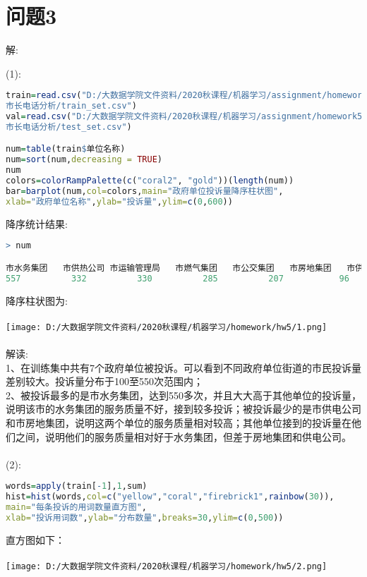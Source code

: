 \documentclass[]{article}
\begin{document}
\section{问题3}
\begin{flushleft}
	解:
\end{flushleft}
(1):
\begin{lstlisting}[language=R]
train=read.csv("D:/大数据学院文件资料/2020秋课程/机器学习/assignment/homework5/
市长电话分析/train_set.csv")
val=read.csv("D:/大数据学院文件资料/2020秋课程/机器学习/assignment/homework5/
市长电话分析/test_set.csv")

num=table(train$单位名称)
num=sort(num,decreasing = TRUE)
num
colors=colorRampPalette(c("coral2", "gold"))(length(num))
bar=barplot(num,col=colors,main="政府单位投诉量降序柱状图",
xlab="政府单位名称",ylab="投诉量",ylim=c(0,600))
\end{lstlisting}
降序统计结果:
\begin{lstlisting}[language=R]
> num

市水务集团   市供热公司 市运输管理局   市燃气集团   市公交集团   市房地集团   市供电公司 
557          332          330          285          207           96           93 
\end{lstlisting}
降序柱状图为:\\\\
\texttt{[image: D:/大数据学院文件资料/2020秋课程/机器学习/homework/hw5/1.png]}\\\\
解读:\\
1、在训练集中共有7个政府单位被投诉。可以看到不同政府单位街道的市民投诉量差别较大。投诉量分布于100至550次范围内；\\
2、被投诉最多的是市水务集团，达到550多次，并且大大高于其他单位的投诉量，说明该市的水务集团的服务质量不好，接到较多投诉；被投诉最少的是市供电公司和市房地集团，说明这两个单位的服务质量相对较高；其他单位接到的投诉量在他们之间，说明他们的服务质量相对好于水务集团，但差于房地集团和供电公司。\\\\
(2):
\begin{lstlisting}[language=R]
words=apply(train[-1],1,sum)
hist=hist(words,col=c("yellow","coral","firebrick1",rainbow(30)),
main="每条投诉的用词数量直方图",
xlab="投诉用词数",ylab="分布数量",breaks=30,ylim=c(0,500))
\end{lstlisting}
直方图如下：\\\\
\texttt{[image: D:/大数据学院文件资料/2020秋课程/机器学习/homework/hw5/2.png]}\\\\
\end{document}
